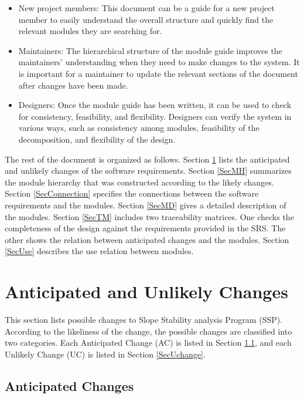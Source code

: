 \documentclass[12pt, titlepage]{article}
\newcommand{\progname}{SSP}
\begin{document}
\begin{itemize}
\item New project members: This document can be a guide for a new
  project member to easily understand the overall structure and
  quickly find the relevant modules they are searching for.
\item Maintainers: The hierarchical structure of the module guide
  improves the maintainers' understanding when they need to make
  changes to the system. It is important for a maintainer to update
  the relevant sections of the document after changes have been made.
\item Designers: Once the module guide has been written, it can be
  used to check for consistency, feasibility, and flexibility. Designers can 
  verify the system in various ways, such as consistency among modules, 
  feasibility of the decomposition, and flexibility of the design.
\end{itemize}

The rest of the document is organized as follows. Section
\ref{SecChange} lists the anticipated and unlikely changes of the
software requirements. Section \ref{SecMH} summarizes the module
hierarchy that was constructed according to the likely
changes. Section \ref{SecConnection} specifies the connections between
the software requirements and the modules. Section \ref{SecMD} gives a
detailed description of the modules. Section \ref{SecTM} includes two
traceability matrices. One checks the completeness of the design
against the requirements provided in the SRS. The other shows the
relation between anticipated changes and the modules. Section
\ref{SecUse} describes the use relation between modules.

\section{Anticipated and Unlikely Changes} \label{SecChange}

\hspace{3ex}This section lists possible changes to Slope Stability analysis 
Program (\progname{}). According to the likeliness of the change, the possible
changes are classified into two categories. Each Anticipated Change (AC) is
listed in Section \ref{SecAchange}, and each Unlikely Change (UC) is listed in
Section \ref{SecUchange}.

\subsection{Anticipated Changes} \label{SecAchange}
\end{document}
